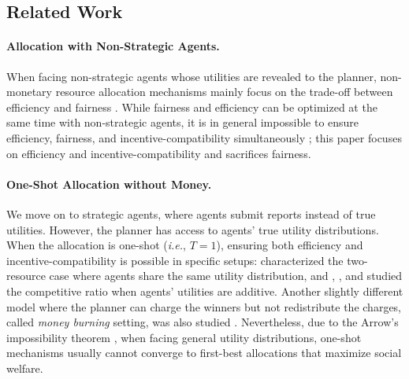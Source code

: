 \subsection{Related Work}\label{sec:related work}
\paragraph{Allocation with Non-Strategic Agents.}
When facing non-strategic agents whose utilities are revealed to the planner, non-monetary resource allocation mechanisms mainly focus on the trade-off between efficiency and fairness \citep{moulin2002proportional,procaccia2013approximate,caragiannis2019unreasonable}.
While fairness and efficiency can be optimized at the same time with non-strategic agents, it is in general impossible to ensure efficiency, fairness, and incentive-compatibility simultaneously \citep{budish2011combinatorial}; this paper focuses on efficiency and incentive-compatibility and sacrifices fairness.

\paragraph{One-Shot Allocation without Money.}
We move on to strategic agents, where agents submit reports instead of true utilities. However, the planner has access to agents' true utility distributions.
When the allocation is one-shot (\textit{i.e.}, $T=1$), ensuring both efficiency and incentive-compatibility is possible in specific setups: \citet{miralles2012cardinal} characterized the two-resource case where agents share the same utility distribution, and \citet{guo2010strategy}, \citet{han2011strategy}, and \citet{cole2013positive} studied the competitive ratio when agents' utilities are additive. Another slightly different model where the planner can charge the winners but not redistribute the charges, called \textit{money burning} setting, was also studied \citep{hartline2008optimal,hoppe2009theory,condorelli2012money}. Nevertheless, due to the Arrow's impossibility theorem \citep{arrow1950difficulty,gi73,s75}, when facing general utility distributions, one-shot mechanisms usually cannot converge to first-best allocations that maximize social welfare.

